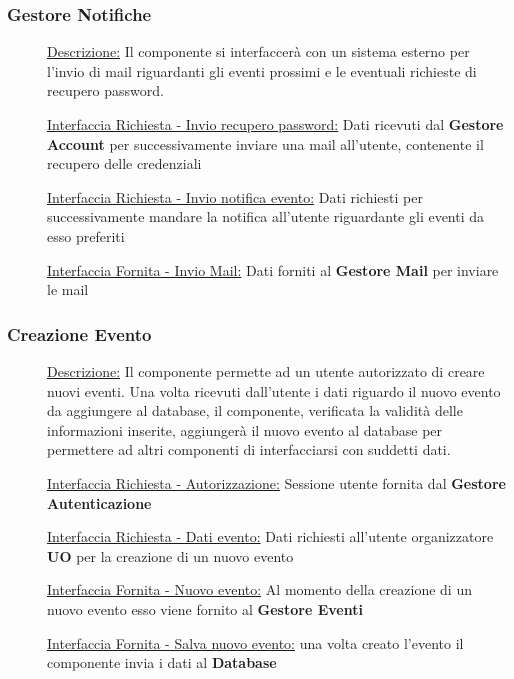 \documentclass{article}
\begin{document}
\subsubsection{Gestore Notifiche}
\begin{description}
    \item[] \underline{Descrizione:} Il componente si interfaccerà con un sistema esterno per l'invio di mail riguardanti gli eventi prossimi e le eventuali richieste di recupero password.
    \item[] \underline{Interfaccia Richiesta - Invio recupero password:} Dati ricevuti dal \textbf{Gestore Account} per successivamente inviare una mail all'utente, contenente il recupero delle credenziali
    \item[] \underline{Interfaccia Richiesta - Invio notifica evento:} Dati richiesti per successivamente mandare la notifica all'utente riguardante gli eventi da esso preferiti
    \item[] \underline{Interfaccia Fornita - Invio Mail:} Dati forniti al \textbf{Gestore Mail} per inviare le mail
\end{description}
\subsubsection{Creazione Evento}
\begin{description}
    \item[] \underline{Descrizione:} Il componente permette ad un utente autorizzato di creare nuovi eventi. Una volta ricevuti dall'utente i dati riguardo il nuovo evento da aggiungere al database, il componente, verificata la validità delle informazioni inserite, aggiungerà il nuovo evento al database per permettere ad altri componenti di interfacciarsi con suddetti dati.
    \item[] \underline{Interfaccia Richiesta - Autorizzazione:} Sessione utente fornita dal \textbf{Gestore Autenticazione}
    \item[] \underline{Interfaccia Richiesta - Dati evento:} Dati richiesti all'utente organizzatore \textbf{UO} per la creazione di un nuovo evento
    \item[] \underline{Interfaccia Fornita - Nuovo evento:} Al momento della creazione di un nuovo evento esso viene fornito al \textbf{Gestore Eventi}
    \item[] \underline{Interfaccia Fornita - Salva nuovo evento:} una volta creato l'evento il componente invia i dati al \textbf{Database}
\end{description}
\end{document}
